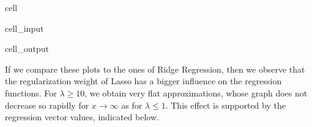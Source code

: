 \documentclass[letterpaper,10pt,english]{jupyterBook}
\begin{document}
\begin{sphinxuseclass}{cell}
\begin{sphinxVerbatimInput}
\begin{sphinxuseclass}{cell_input}
\end{sphinxuseclass}\end{sphinxVerbatimInput}
\begin{sphinxVerbatimOutput}

\begin{sphinxuseclass}{cell_output}
\noindent{}

\end{sphinxuseclass}\end{sphinxVerbatimOutput}

\end{sphinxuseclass}
\sphinxAtStartPar
If we compare these plots to the ones of Ridge Regression, then we observe that the regularization weight of Lasso has a bigger influence on the regression functions. For \(\lambda\geq 10\), we obtain very flat approximations, whose graph does not decrease so rapidly for \(x\rightarrow \infty\) as for  \(\lambda\leq 1\). This effect is supported by the regression vector values, indicated below.
\end{document}
